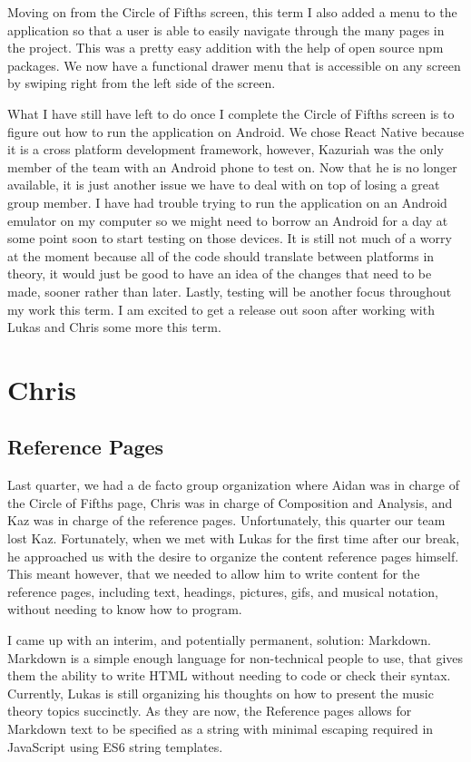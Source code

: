 \documentclass[onecolumn, draftclsnofoot,10pt, compsoc]{IEEEtran}
\begin{document}
Moving on from the Circle of Fifths screen, this term I also added a menu to the application so that a user is able to easily navigate through the many pages in the project. 
This was a pretty easy addition with the help of open source npm packages. 
We now have a functional drawer menu that is accessible on any screen by swiping right from the left side of the screen.

What I have still have left to do once I complete the Circle of Fifths screen is to figure out how to run the application on Android. 
We chose React Native because it is a cross platform development framework, however, Kazuriah was the only member of the team with an Android phone to test on. 
Now that he is no longer available, it is just another issue we have to deal with on top of losing a great group member. 
I have had trouble trying to run the application on an Android emulator on my computer so we might need to borrow an Android for a day at some point soon to start testing on those devices.
It is still not much of a worry at the moment because all of the code should translate between platforms in theory, it would just be good to have an idea of the changes that need to be made, sooner rather than later.
Lastly, testing will be another focus throughout my work this term. 
I am excited to get a release out soon after working with Lukas and Chris some more this term.


\section{Chris}
\subsection{Reference Pages}
Last quarter, we had a de facto group organization where Aidan was in charge of the Circle of Fifths page, Chris was in charge of Composition and Analysis, and Kaz was in charge of the reference pages. 
Unfortunately, this quarter our team lost Kaz. 
Fortunately, when we met with Lukas for the first time after our break, he approached us with the desire to organize the content reference pages himself. 
This meant however, that we needed to allow him to write content for the reference pages, including text, headings, pictures, gifs, and musical notation, without needing to know how to program. 

I came up with an interim, and potentially permanent, solution: Markdown. 
Markdown is a simple enough language for non-technical people to use, that gives them the ability to write HTML without needing to code or check their syntax.
Currently, Lukas is still organizing his thoughts on how to present the music theory topics succinctly.
As they are now, the Reference pages allows for Markdown text to be specified as a string with minimal escaping required in JavaScript using ES6 string templates.
\end{document}
